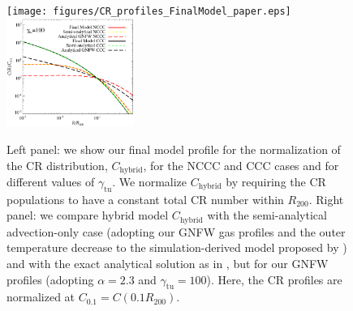 \documentclass[traditabstract]{aa}
\newcommand{\rmn}{\mathrm}
\begin{document}
\begin{figure}[t]
\centering
\texttt{[image: figures/CR\_profiles\_FinalModel\_paper.eps]}
\includegraphics[width=0.37\textwidth]{figures/CR_profiles_FinalModelvsREX_norm0.1.eps}
\caption{Left panel: we show our final model profile for the normalization of
  the CR distribution, $C_{\rmn{hybrid}}$, for the NCCC and CCC cases and for
  different values of $\gamma_{\rmn{tu}}$. We normalize $C_{\rmn{hybrid}}$ by
  requiring the CR populations to have a constant total CR number within
  $R_{200}$. Right panel: we compare hybrid model $C_{\rmn{hybrid}}$ with the semi-analytical
  advection-only case (adopting our GNFW gas profiles and the outer temperature
  decrease to the simulation-derived model proposed by
  \citep{2010MNRAS.409..449P}) and with the exact analytical solution as in
  \citet{2011A&A...527A..99E}, but for our GNFW profiles (adopting $\alpha=2.3$
  and $\gamma_{\rmn{tu}}=100$). Here, the CR profiles are normalized at
  $C_{0.1}=C(0.1R_{200})$.}
\label{fig:CRFinalModel}
\end{figure}
\end{document}
